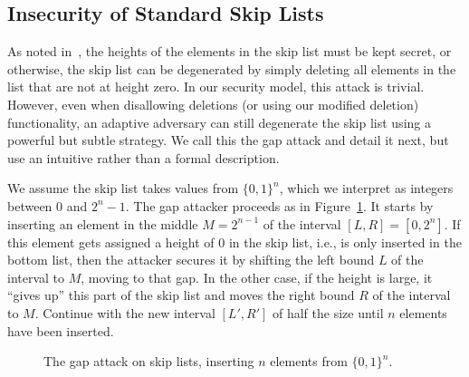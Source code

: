 \subsection{Insecurity of Standard Skip Lists}\label{sec:gap-attack}

As noted in~\cite{pugh}, the heights of the elements in the skip list must be kept secret, or otherwise, the skip list can be degenerated by simply deleting all elements in the list that are not at height zero. In our security model, this attack is trivial. However, even when disallowing deletions (or using our modified deletion) functionality, an adaptive adversary can still degenerate the skip list using a powerful but subtle strategy. We call this the gap attack and detail it next, but use an intuitive rather than a formal description.

We assume the skip list takes values from $\{0,1\}^n$, which we interpret as integers between $0$ and $2^n-1$. The gap attacker proceeds as in Figure~\ref{fig:gap}. It starts by inserting an element in the middle $M=2^{n-1}$ of the interval $[L,R]=[0,2^{n}]$. If this element gets assigned a height of $0$ in the skip list, i.e., is only inserted in the bottom list, then the attacker secures it by shifting the left bound $L$ of the interval to $M$, moving to that gap. In the other case, if the height is large, it ``gives up'' this part of the skip list and moves the right bound $R$ of the interval to $M$. Continue with the new interval $[L',R']$ of half the size until $n$ elements have been inserted.
\begin{figure}[h]
		\centering
		\begin{pchstack}[boxed,center,space=0.5em]
		\end{pchstack}
  \caption[The Gap Attack.]{The gap attack on skip lists, inserting $n$ elements from $\{0,1\}^n$.   
  } 
  \label{fig:gap}
\end{figure}


